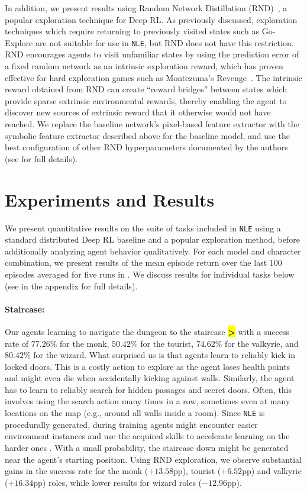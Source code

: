 \documentclass{article}
\newcommand{\NLE}{\texttt{NLE}}
\newcommand{\StaircaseDown}{{\bf\ttfamily\color{nethack_light_gray}\sethlcolor{black}\hl{>}}}
\begin{document}
In addition, we present results using Random Network Distillation (RND)~\citep{DBLP:conf/iclr/BurdaESK19}, a popular exploration technique for Deep RL.
As previously discussed, exploration techniques which require returning to previously visited states such as Go-Explore are not suitable for use in \NLE{}, but RND does not have this restriction.
RND encourages agents to visit unfamiliar states by using the prediction error of a fixed random network as an intrinsic exploration reward, which has proven effective for hard exploration games such as Montezuma's Revenge~\citep{DBLP:conf/iclr/BurdaEPSDE19}.
The intrinsic reward obtained from RND can create ``reward bridges'' between states which provide sparse extrinsic environmental rewards, thereby enabling the agent to discover new sources of extrinsic reward that it otherwise would not have reached.
We replace the baseline network's pixel-based feature extractor with the symbolic feature extractor described above for the baseline model, and use the best configuration of other RND hyperparameters documented by the authors (see  for full details).

\section{Experiments and Results}
\label{sec:experiments}
We present quantitative results on the suite of tasks included in \NLE{} using a standard distributed Deep RL baseline and a popular exploration method, before additionally analyzing agent behavior qualitatively.
For each model and character combination, we present results of the mean episode return over the last $100$ episodes averaged for five runs in . We discuss results for
individual tasks below (see  in the appendix for full details).


\paragraph{Staircase:}
Our agents learning to navigate the dungeon to the staircase \StaircaseDown{} with a success rate of $77.26\%$ for the monk, $50.42\%$ for the tourist, $74.62\%$ for the valkyrie, and $80.42\%$ for the wizard.
What surprised us is that agents learn to reliably kick in locked doors. This is a costly action to explore as the agent loses health points and might even die when
accidentally kicking against walls.
Similarly, the agent has to learn to reliably search for hidden passages and secret doors.
Often, this involves using the search action many times in a row, sometimes even at many locations on the map (e.g., around all walls inside a room).
Since \NLE{} is procedurally generated, during training agents might encounter easier environment instances and use the acquired skills to accelerate learning on the harder ones \cite{DBLP:journals/corr/abs-1911-13071,cobbe2019procgen}.
With a small probability, the staircase down might be generated  near the agent's starting position.
Using RND exploration, we observe substantial gains in the success rate for the monk ($+13.58$pp), tourist ($+6.52$pp) and valkyrie ($+16.34$pp) roles, while lower results for wizard roles ($-12.96$pp).
\end{document}
